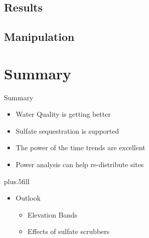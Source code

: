 \documentclass[svgnames,smaller]{beamer}
\begin{document}
		
		
		

	\subsection{Results}

		

	\subsection{Manipulation}
			
	
		

		
		
		
		
		
		
		

\section*{Summary}

\begin{frame}{Summary}
  		\begin{itemize}[<+->]
 			\item Water Quality is getting better	
			\item Sulfate sequestration is supported   
 			\item The power of the time trends are excellent
			\item Power analysis can help re-distribute sites
		  \end{itemize}
  \vskip0pt plus.5fill
		\begin{itemize}[<+->]
			\item Outlook	    
 			\begin{itemize}
  				 \item  Elevation Bands
    				 \item   Effects of sulfate scrubbers
   			\end{itemize}
		\end{itemize}
\end{frame}
\end{document}

